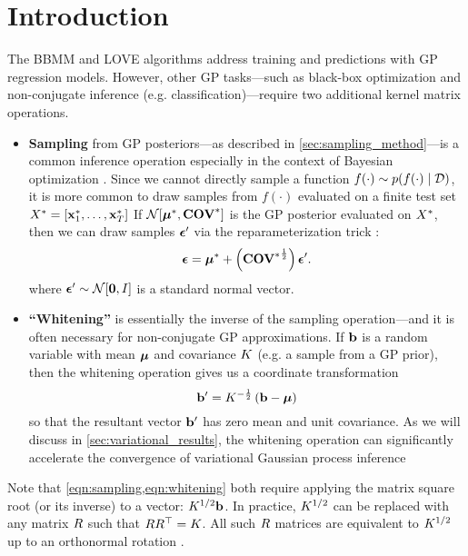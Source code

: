 \section{Introduction}

The BBMM and LOVE algorithms address training and predictions with GP regression models.
However, other GP tasks---such as black-box optimization and non-conjugate inference (e.g. classification)---require two additional kernel matrix operations.
\begin{itemize}
  \item {\bf Sampling} from GP posteriors---as described in \cref{sec:sampling_method}---is a common inference operation especially in the context of Bayesian optimization \cite{thompson1933likelihood,frazier2009knowledge,wang2017max}.
  Since we cannot directly sample a function $f(\cdot) \sim p(f(\cdot) \mid \mathcal D)$, it is more common to draw samples from  $f(\cdot)$ evaluated on a finite test set $X^* = [\mathbf{x}^*_1, \ldots, \mathbf{x}^*_T]$
  If $\normaldist{\bmeantest}{\Covtest}$ is the GP posterior evaluated on $X^*$, then we can draw samples $\boldsymbol{\epsilon}'$ via the reparameterization trick \cite{kingma2014auto,rezende2014stochastic}:
  \begin{equation}
    \boldsymbol{\epsilon} = \boldsymbol{\mu}^* + \left( {\textbf{COV}^*}^{\frac 1 2} \right) \boldsymbol{\epsilon}'.
    \label{eqn:sampling}
  \end{equation}
  where $\bepsilon' \sim \normaldist{\bzero}{\bI}$ is a standard normal vector.

  \item {\bf ``Whitening''} is essentially the inverse of the sampling operation---and it is often necessary for non-conjugate GP approximations.
  If $\mathbf{b}$ is a random variable with mean $\boldsymbol{\mu}$ and covariance $K$ (e.g. a sample from a GP prior), then the whitening operation gives us a coordinate transformation
  \begin{equation}
    \mathbf{b}' = K^{- \frac 1 2} \left( \mathbf{b} - \boldsymbol{\mu} \right)
    \label{eqn:whitening}
  \end{equation}
  so that the resultant vector $\mathbf{b}'$ has zero mean and unit covariance.
  As we will discuss in \cref{sec:variational_results}, the whitening operation can significantly accelerate the convergence of variational Gaussian process inference \cite{kuss2005assessing,hensman2013gaussian,matthews2017scalable}
\end{itemize}
%
Note that \cref{eqn:sampling,eqn:whitening} both require applying the matrix square root (or its inverse) to a vector: $K^{1/2} \mathbf{b}$.
In practice, $K^{1/2}$ can be replaced with any matrix $R$ such that $R R^\top = K$.
All such $R$ matrices are equivalent to $K^{1/2}$ up to an orthonormal rotation \cite{golub2012matrix}.

